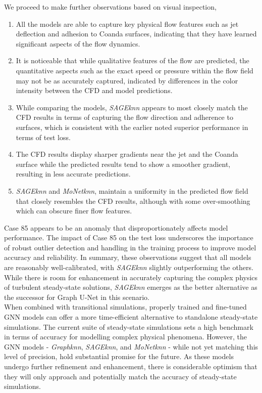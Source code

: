 We proceed to make further observations based on visual inspection, 
\begin{enumerate}
    \item All the models are able to capture key physical flow features such as jet deflection and adhesion to Coanda surfaces, indicating that they have learned significant aspects of the flow dynamics.
    \item It is noticeable that while qualitative features of the flow are predicted, the quantitative aspects such as the exact speed or pressure within the flow field may not be as accurately captured, indicated by differences in the color intensity between the CFD and model predictions.
    \item While comparing the models, \textit{SAGEknn} appears to most closely match the CFD results in terms of capturing the flow direction and adherence to surfaces, which is consistent with the earlier noted superior performance in terms of test loss.
    \item The CFD results display sharper gradients near the jet and the Coanda surface while the predicted results tend to show a smoother gradient, resulting in less accurate predictions.
    \item \textit{SAGEknn} and \textit{MoNetknn}, maintain a uniformity in the predicted flow field that closely resembles the CFD results, although with some over-smoothing which can obscure finer flow features.
\end{enumerate}
Case 85 appears to be an anomaly that disproportionately affects model performance. The impact of Case 85 on the test loss underscores the importance of robust outlier detection and handling in the training process to improve model accuracy and reliability. In summary, these observations suggest that all models are reasonably well-calibrated, with \textit{SAGEknn} slightly outperforming the others. While there is room for enhancement in accurately capturing the complex physics of turbulent steady-state solutions, \textit{SAGEknn} emerges as the better alternative as the successor for Graph U-Net in this scenario. \\
When combined with transitional simulations, properly trained and fine-tuned GNN models can offer a more time-efficient alternative to standalone steady-state simulations.
The current suite of steady-state simulations sets a high benchmark in terms of accuracy for modelling complex physical phenomena. However, the GNN models - \textit{Graphknn}, \textit{SAGEknn}, and \textit{MoNetknn} - while not yet matching this level of precision, hold substantial promise for the future. As these models undergo further refinement and enhancement, there is considerable optimism that they will only approach and potentially match the accuracy of steady-state simulations.\\
